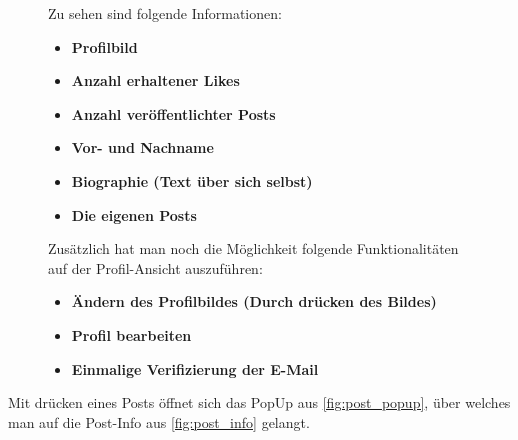 \begin{figure}[H]
\begin{minipage}{.6\textwidth}
\begin{changemargin}{0.5cm}{0cm}
            Zu sehen sind folgende Informationen:
            \begin{itemize}
                \item \textbf{Profilbild}
                \item \textbf{Anzahl erhaltener Likes}
                \item \textbf{Anzahl veröffentlichter Posts}
                \item \textbf{Vor- und Nachname}
                \item \textbf{Biographie (Text über sich selbst)}
                \item \textbf{Die eigenen Posts}
            \end{itemize}

            Zusätzlich hat man noch die Möglichkeit folgende Funktionalitäten auf der Profil-Ansicht auszuführen:
            \begin{itemize}
                \item \textbf{Ändern des Profilbildes (Durch drücken des Bildes)}
                \item \textbf{Profil bearbeiten}
                \item \textbf{Einmalige Verifizierung der E-Mail}
            \end{itemize}
        \end{changemargin}
    \end{minipage}
\end{figure}

Mit drücken eines Posts öffnet sich das PopUp aus \autoref{fig:post_popup}, über welches man auf die Post-Info aus \autoref{fig:post_info} gelangt.


